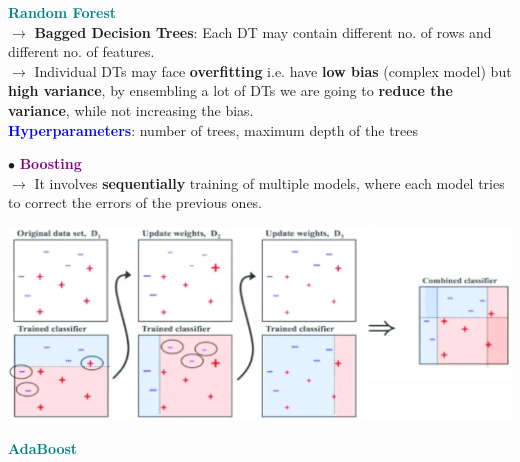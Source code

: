 \documentclass[letterpaper, 10.5pt,landscape]{article}
\begin{document}
\begin{multicols*}{3}
\vspace{3pt}
\textcolor{teal}{\textbf{Random Forest}} \\
$\rightarrow$\textbf{ Bagged Decision Trees}: Each DT may contain different no. of rows and different no. of features. \\
$\rightarrow$ Individual DTs may face \textbf{overfitting} i.e. have \textbf{low bias} (complex model) but \textbf{high variance}, by ensembling a lot of DTs we are going to \textbf{reduce the variance}, while not increasing the bias. \\ 
\textbf{\textcolor{blue}{Hyperparameters}}: number of trees, maximum depth of the trees 

\vspace{7pt}
$\bullet$ \textbf{\textcolor{purple}{Boosting}} \\
$\rightarrow$ It involves \textbf{sequentially} training of multiple models, where each model tries to correct the errors of the previous ones.



\vspace{-5pt}
\begin{center}
    \begin{minipage}{\linewidth}
    \includegraphics[width=\textwidth]{figures/boosting.PNG}
    \end{minipage}
\end{center}
\vspace{-5pt}



\vspace{3pt}
\textcolor{teal}{\textbf{AdaBoost}} \\


\end{multicols*}
\end{document}
